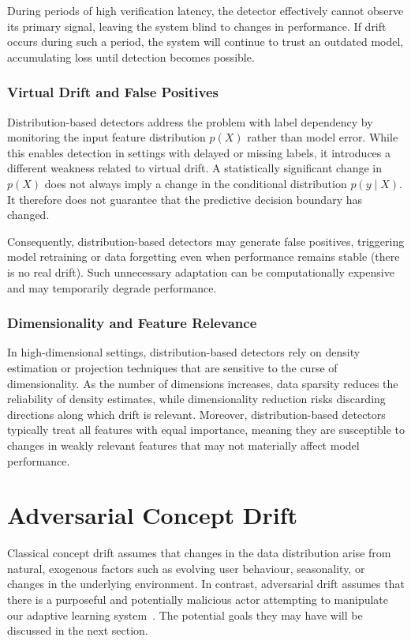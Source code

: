 During periods of high verification latency, the detector effectively cannot observe its primary signal, leaving the system blind to changes in performance. If drift occurs during such a period, the system will continue to trust an outdated model, accumulating loss until detection becomes possible.

\subsubsection{Virtual Drift and False Positives}
Distribution-based detectors address the problem with label dependency by monitoring the input feature distribution $p(X)$ rather than model error. While this enables detection in settings with delayed or missing labels, it introduces a different weakness related to virtual drift. A statistically significant change in $p(X)$ does not always imply a change in the conditional distribution $p(y \mid X)$. It therefore does not guarantee that the predictive decision boundary has changed.

Consequently, distribution-based detectors may generate false positives, triggering model retraining or data forgetting even when performance remains stable (there is no real drift). Such unnecessary adaptation can be computationally expensive and may temporarily degrade performance.

\subsubsection{Dimensionality and Feature Relevance}
In high-dimensional settings, distribution-based detectors rely on density estimation or projection techniques that are sensitive to the curse of dimensionality. As the number of dimensions increases, data sparsity reduces the reliability of density estimates, while dimensionality reduction risks discarding directions along which drift is relevant. Moreover, distribution-based detectors typically treat all features with equal importance, meaning they are susceptible to changes in weakly relevant features that may not materially affect model performance.


\section{Adversarial Concept Drift}
Classical concept drift assumes that changes in the data distribution arise from natural, exogenous factors such as evolving user behaviour, seasonality, or changes in the underlying environment. In contrast, adversarial drift assumes that there is a purposeful and potentially malicious actor attempting to manipulate our adaptive learning system~\cite{Korycki_2022}. The potential goals they may have will be discussed in the next section. 

